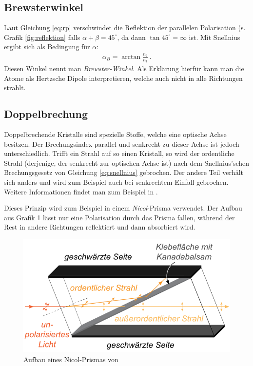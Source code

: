 \documentclass[12pt,a4paper,titlepage,headinclude,bibtotoc]{scrartcl}
\begin{document}
\subsection{Brewsterwinkel}
Laut Gleichung \eqref{eq:rp} verschwindet die Reflektion der parallelen Polarisation (s. Grafik \ref{fig:reflektion} falls $\alpha+\beta=45^\circ$, da dann $\tan 45^\circ = \infty$ ist.
Mit Snellnius ergibt sich als Bedingung für $\alpha$:
\begin{align}
	\alpha_B=\arctan\frac{n_2}{n_1}\, .
\end{align}
Diesen Winkel nennt man \textit{Brewster-Winkel}.
Als Erklärung hierfür kann man die Atome als Hertzsche Dipole interpretieren, welche auch nicht in alle Richtungen strahlt.



\subsection{Doppelbrechung}
Doppelbrechende Kristalle sind spezielle Stoffe, welche eine optische Achse besitzen.
Der Brechungsindex parallel und senkrecht zu dieser Achse ist jedoch unterschiedlich.
Trifft ein Strahl auf so einen Kristall, so wird der ordentliche Strahl (derjenige, der senkrecht zur optischen Achse ist) nach dem Snellnius'schen Brechungsgesetz von Gleichung \eqref{eq:snellnius} gebrochen.
Der andere Teil verhält sich anders und wird zum Beispiel auch bei senkrechtem Einfall gebrochen.
Weitere Informationen findet man zum Beispiel in \cite[S. 251]{demtroeder2}.

Dieses Prinzip wird zum Beispiel in einem \textit{Nicol}-Prisma verwendet.
Der Aufbau aus Grafik \ref{fig:nicol} lässt nur eine Polarisation durch das Prisma fallen, während der Rest in andere Richtungen reflektiert und dann absorbiert wird.
\begin{figure}[h]
	\centering
	\includegraphics{nicol}
	\caption{Aufbau eines Nicol-Prismas von \cite[28.3.2015, 11 Uhr]{lp20}}
	\label{fig:nicol}
\end{figure}
\end{document}
